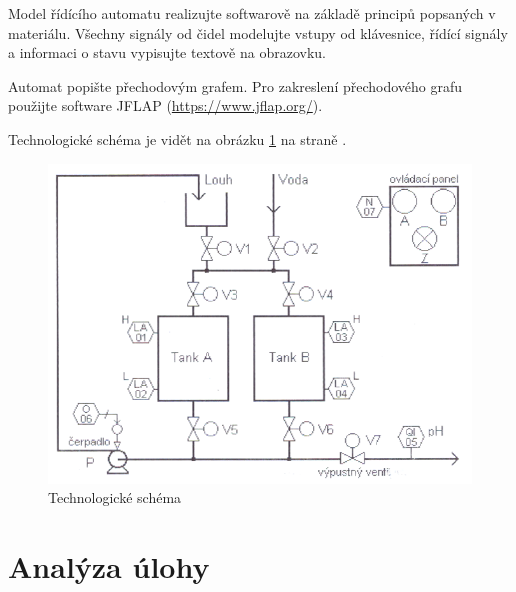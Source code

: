 \documentclass[12pt]{report}
\begin{document}
	Model řídícího automatu realizujte softwarově na základě principů popsaných v materiálu. Všechny signály od čidel modelujte vstupy od klávesnice, řídící signály a informaci o stavu vypisujte textově na obrazovku.
	
	Automat popište přechodovým grafem. Pro zakreslení přechodového grafu použijte software JFLAP (\href{https://www.jflap.org/}{https://www.jflap.org/}).
	
	Technologické schéma je vidět na obrázku \ref{fig:schema} na straně \pageref{fig:schema}.
	
	\begin{figure}
		\centering
		\includegraphics[width=0.6\textheight]{schema}
		\caption{Technologické schéma}
		\label{fig:schema}
	\end{figure}
	
	\chapter{Analýza úlohy}
	
\end{document}
